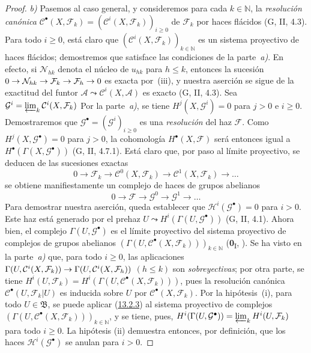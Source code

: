 \documentclass[10pt,oneside,openany]{book}
\makeatletter
\theoremstyle{egaenv}\newtheorem*{env}{---}
\theoremstyle{egastatement}
\theoremstyle{egadescription}
\newcommand{\oldpage}[2][]{\marginnote{\normalfont\scriptsize\textbf{#1}\,|\,#2}\ignorespaces}
\newcommand{\EGAMaybeRefLink}[2]{\@ifundefined{r@#1}{#2}{\hyperref[#1]{#2}}}
\newcommand{\EGAUnavailableHyperref}[2]{\EGAMaybeRefLink{#1}{#2}}
\renewcommand{\leq}{\leqslant}
\renewcommand{\geq}{\geqslant}
\renewcommand{\to}{\mathchoice{\longrightarrow}{\rightarrow}{\rightarrow}{\rightarrow}}
\makeatother
\begin{document}
\begin{proof}
\emph{b)} Pasemos al caso general, y consideremos para cada $k\in\mathbb N$, la \emph{resolución canónica} $\mathcal C^\bullet(X,\mathcal F_k)
=(\mathcal C^i(X,\mathcal F_k))_{i\geq0}$
de $\mathcal F_k$ por haces flácidos (G, II, 4.3).
Para todo $i\geq0$, está claro que
$(\mathcal C^i(X,\mathcal F_k))_{k\in\mathbb N}$ es un sistema proyectivo de
haces flácidos; demostremos que satisface las condiciones de la
parte~\emph{a)}.
\oldpage[0\textsubscript{III}]{69}
En efecto, si $\mathcal N_{hk}$ denota el núcleo de $u_{hk}$ para $h\leq k$,
entonces la sucesión
$0\to\mathcal N_{hk}\to\mathcal F_k\to\mathcal F_h\to0$
es exacta por~{\rm(iii)}, y nuestra aserción se sigue de la exactitud
del funtor
$\mathcal A\leadsto\mathcal C^i(X,\mathcal A)$ es exacto (G, II, 4.3). Sea $\mathcal G^i=\varprojlim_k\mathcal C^i(X,\mathcal F_k)$
Por la parte~\emph{a)}, se tiene
$H^j(X,\mathcal G^i)=0$ para $j>0$ e $i\geq0$.
Demostraremos que
$\mathcal G^\bullet=(\mathcal G^i)_{i\geq0}$ es una \emph{resolución} del haz
$\mathcal F$. Como $H^j(X,\mathcal G^\bullet)=0$ para $j>0$, la cohomología
$H^\bullet(X,\mathcal F)$ será entonces igual a
$H^\bullet(\Gamma(X,\mathcal G^\bullet))$ (G, II, 4.7.1). Está claro que, por paso al límite proyectivo, se deducen de las sucesiones exactas \[
0\longrightarrow\mathcal F_k
\longrightarrow\mathcal C^0(X,\mathcal F_k)
\longrightarrow\mathcal C^1(X,\mathcal F_k)\longrightarrow\ldots
\]
se obtiene manifiestamente un complejo de haces de grupos abelianos
\[
0\longrightarrow\mathcal F\longrightarrow\mathcal G^0
\longrightarrow\mathcal G^1\longrightarrow\ldots
\]
Para demostrar nuestra aserción, queda establecer que
$\mathcal H^i(\mathcal G^\bullet)=0$ para $i>0$.
Este haz está generado por el prehaz
$U\leadsto H^i(\Gamma(U,\mathcal G^\bullet))$
(G, II, 4.1).
Ahora bien, el complejo $\Gamma(U,\mathcal G^\bullet)$ es el límite proyectivo
del sistema proyectivo de complejos de grupos abelianos
$(\Gamma(U,\mathcal C^\bullet(X,\mathcal F_k)))_{k\in\mathbb N}$
(\textbf{0}\textsubscript{I}, \EGAUnavailableHyperref{0.3.2.6}{3.2.6}).
Se ha visto en la parte~\emph{a)} que, para todo $i\geq0$, las aplicaciones $\Gamma(U,\mathcal C^i(X,\mathcal F_k))\to
\Gamma(U,\mathcal C^i(X,\mathcal F_h))$ $(h\leq k)$ son \emph{sobreyectivas}; por otra parte, se tiene
$H^i(U,\mathcal F_k)=
H^i(\Gamma(U,\mathcal C^\bullet(X,\mathcal F_k)))$,
pues la resolución canónica $\mathcal C^\bullet(U,\mathcal F_k|U)$ es
inducida sobre $U$ por $\mathcal C^\bullet(X,\mathcal F_k)$.
Por la hipótesis~{\rm(i)}, para todo $U\in\mathfrak B$, se puede aplicar (\hyperref[0.13.2.3-fr]{13.2.3}) al sistema proyectivo de complejos $(\Gamma(U,\mathcal C^\bullet(X,\mathcal F_k)))_{k\in\mathbb N}$, y se tiene, pues, $H^i(\Gamma(U,\mathcal G^\bullet))=\varprojlim_k H^i(U,\mathcal F_k)$ para todo $i\geq0$. La hipótesis (ii) demuestra entonces, por definición, que los haces $\mathcal H^i(\mathcal G^\bullet)$ se anulan para $i>0$.


\end{proof}
\end{document}
